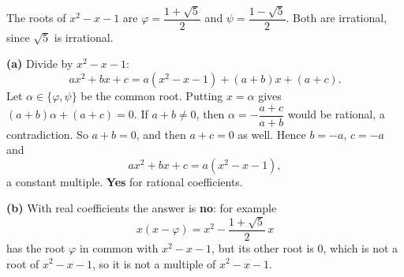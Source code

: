 The roots of $x^2-x-1$ are $\varphi=\dfrac{1+\sqrt5}{2}$ and $\psi=\dfrac{1-\sqrt5}{2}$. Both are irrational, since $\sqrt5$ is irrational.

\textbf{(a)} Divide by $x^2-x-1$:
\[
ax^2+bx+c=a(x^2-x-1)+(a+b)x+(a+c).
\]
Let $\alpha\in\{\varphi,\psi\}$ be the common root. Putting $x=\alpha$ gives $(a+b)\alpha+(a+c)=0$. If $a+b\ne0$, then $\alpha=-\dfrac{a+c}{a+b}$ would be rational, a contradiction. So $a+b=0$, and then $a+c=0$ as well. Hence $b=-a$, $c=-a$ and
\[
ax^2+bx+c=a(x^2-x-1),
\]
a constant multiple. \textbf{Yes} for rational coefficients.

\textbf{(b)} With real coefficients the answer is \textbf{no}: for example
\[
x(x-\varphi)=x^2-\dfrac{1+\sqrt5}{2}\,x
\]
has the root $\varphi$ in common with $x^2-x-1$, but its other root is $0$, which is not a root of $x^2-x-1$, so it is not a multiple of $x^2-x-1$.
